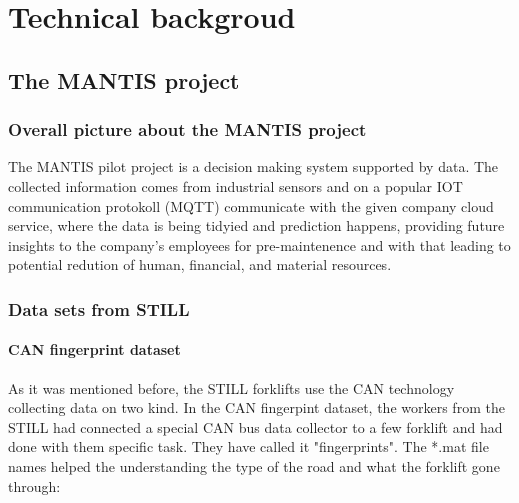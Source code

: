 \chapter{Technical backgroud}
	\section{The MANTIS project}
		\subsection{Overall picture about the MANTIS project}
The MANTIS pilot project is a decision making system supported by data. The collected information comes from industrial sensors and on a popular IOT communication protokoll (MQTT) communicate with the given company cloud service, where the data is being tidyied and prediction happens, providing future insights to the company's employees for pre-maintenence and with that leading to potential redution of human, financial, and material resources.

		\subsection{Data sets from STILL}
			\subsubsection{CAN fingerprint dataset}
				\noindent
As it was mentioned before, the STILL forklifts use the CAN technology collecting data on two kind. In the CAN fingerpint dataset, the workers from the STILL had  connected a special CAN bus data collector to a few forklift and had done with them specific task. They have called it "fingerprints". The *.mat file names helped the understanding the type of the road and what the forklift gone through:

